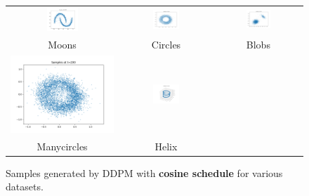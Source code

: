 \documentclass[11pt]{article}
\begin{document}
\begin{figure}[H]
    \centering
    \begin{tabular}{ccc}
        \includegraphics[width=0.3\textwidth]{exps/ddpm_2_200_cosine_moons/samples_200.png} &
        \includegraphics[width=0.3\textwidth]{exps/ddpm_2_200_cosine_circles/samples_200.png} &
        \includegraphics[width=0.3\textwidth]{exps/ddpm_2_200_cosine_blobs/samples_200.png} \\
        Moons & Circles & Blobs \\[0.5em]
        
        \includegraphics[width=0.3 \textwidth]{exps/ddpm_2_200_cosine_manycircles/samples_200.png} &
        \includegraphics[width=0.3\textwidth]{exps/ddpm_3_200_cosine_helix/samples_200.png} & \\
        Manycircles & Helix & \\
    \end{tabular}
    \caption{Samples generated by DDPM with \textbf{cosine schedule} for various datasets.}
    \label{fig:cosine_schedule}
\end{figure}
\end{document}
